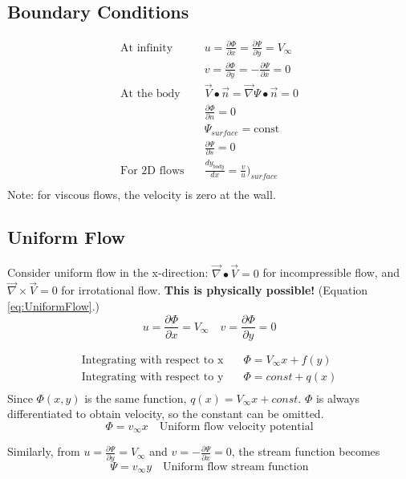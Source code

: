 \documentclass[draft=false, titlepage]{article}
\newcommand{\gradient}{\vec{\nabla}}
\newcommand{\partialfrac}[2]{\frac{\partial #1}{\partial #2}}
\begin{document}
\subsection{Boundary Conditions}
\begin{align*}
    \text{At infinity} \quad & u = \partialfrac{\Phi}{x} = \partialfrac{\Psi}{y} = V_\infty \\
    & v = \partialfrac{\Phi}{y} = -\partialfrac{\Psi}{x} = 0\\
    \text{At the body} \quad & \vec{V}\bullet \vec{n} = \gradient \Psi \bullet \vec{n} = 0\\
    & \partialfrac{\Phi}{n} = 0\\
    & \Psi_{surface} = \text{const} \\
    & \partialfrac{\Psi}{s} = 0\\
    \text{For 2D flows} \quad & \frac{dy_{body}}{dx} = \frac{v}{u}\Big)_{surface} \\
\end{align*}
Note: for viscous flows, the velocity is zero at the wall.

\subsection{Uniform Flow}
Consider uniform flow in the x-direction: $\gradient \bullet \vec{V} = 0$ for incompressible flow, and $\gradient \times \vec{V} = 0$ for irrotational flow. \textbf{This is physically possible!} (Equation \ref{eq:UniformFlow}.)
\begin{equation}
    u = \partialfrac{\Phi}{x} = V_\infty \quad v = \partialfrac{\Phi}{y} = 0
    \label{eq:UniformFlow}
\end{equation}

\begin{align*}
    \text{Integrating with respect to x} \quad &
    \Phi = V_\infty x + f(y)\\
    \text{Integrating with respect to y} \quad & \Phi = const + q(x)\\
\end{align*}
Since $\Phi(x,y)$ is the same function, $q(x) = V_\infty x + const$. $\Phi$ is always differentiated to obtain velocity, so the constant can be omitted.
\begin{equation*}
    \boxed{\Phi = v_\infty x} \quad \text{Uniform flow velocity potential}
\end{equation*}

Similarly, from $u = \partialfrac{\Psi}{y} = V_\infty$ and $v = -\partialfrac{\Psi}{x} = 0$, the stream function becomes
\begin{equation*}
    \boxed{\Psi = v_\infty y} \quad \text{Uniform flow stream function}
\end{equation*}
\end{document}
